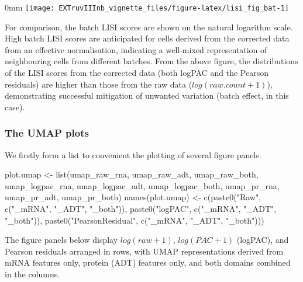 \documentclass[]{article}
\newcommand{\hlstr}[1]{\textcolor[rgb]{0.251,0.627,0.251}{#1}}%
\newcommand{\hlstd}[1]{\textcolor[rgb]{0.251,0.251,0.251}{#1}}%
\newenvironment{Shaded}{\begin{myshaded}}{\end{myshaded}}
\newcommand{\StringTok}[1]{\hlstr{#1}}
\newcommand{\OtherTok}[1]{{#1}}
\newcommand{\FunctionTok}[1]{\hlstd{#1}}
\newcommand{\NormalTok}[1]{\hlstd{#1}}
\begin{document}
\begin{adjustwidth}{\fltoffset}{0mm}
\texttt{[image: EXTruvIIInb\_vignette\_files/figure-latex/lisi\_fig\_bat-1]} \end{adjustwidth}

For comparison, the batch LISI scores are shown on the natural logarithm scale. High batch LISI scores are anticipated for cells derived from the corrected data from an effective normalisation, indicating a well-mixed representation of neighbouring cells from different batches. From the above figure, the distributions of the LISI scores from the corrected data (both logPAC and the Pearson residuals) are higher than those from the raw data (\(log(raw.count + 1)\)), demonstrating successful mitigation of unwanted variation (batch effect, in this case).

\subsubsection{The UMAP plots}\label{the-umap-plots}

We firstly form a list to convenient the plotting of several figure panels.

\begin{Shaded}
\begin{Highlighting}[]
\NormalTok{plot.umap }\OtherTok{\textless{}{-}} \FunctionTok{list}\NormalTok{(umap\_raw\_rna, umap\_raw\_adt, umap\_raw\_both,}
\NormalTok{    umap\_logpac\_rna, umap\_logpac\_adt, umap\_logpac\_both, umap\_pr\_rna,}
\NormalTok{    umap\_pr\_adt, umap\_pr\_both)}
\FunctionTok{names}\NormalTok{(plot.umap) }\OtherTok{\textless{}{-}} \FunctionTok{c}\NormalTok{(}\FunctionTok{paste0}\NormalTok{(}\StringTok{"Raw"}\NormalTok{, }\FunctionTok{c}\NormalTok{(}\StringTok{"\_mRNA"}\NormalTok{, }\StringTok{"\_ADT"}\NormalTok{, }\StringTok{"\_both"}\NormalTok{)),}
    \FunctionTok{paste0}\NormalTok{(}\StringTok{"logPAC"}\NormalTok{, }\FunctionTok{c}\NormalTok{(}\StringTok{"\_mRNA"}\NormalTok{, }\StringTok{"\_ADT"}\NormalTok{, }\StringTok{"\_both"}\NormalTok{)), }\FunctionTok{paste0}\NormalTok{(}\StringTok{"PearsonResidual"}\NormalTok{,}
        \FunctionTok{c}\NormalTok{(}\StringTok{"\_mRNA"}\NormalTok{, }\StringTok{"\_ADT"}\NormalTok{, }\StringTok{"\_both"}\NormalTok{)))}
\end{Highlighting}
\end{Shaded}

The figure panels below display \(log(raw+1)\), \(log(PAC+1)\) (logPAC), and Pearson residuals arranged in rows, with UMAP representations derived from mRNA features only, protein (ADT) features only, and both domains combined in the columns.
\end{document}
